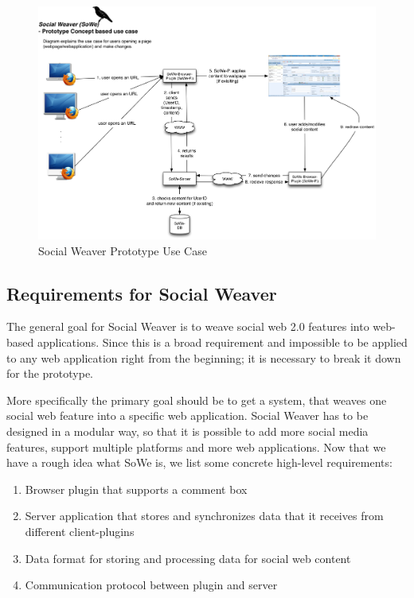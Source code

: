 \begin{figure}\centering
		\includegraphics[width=13cm]{images/sowe-prototype-use-case.png}
		\caption{Social Weaver Prototype Use Case}
		\label{sowe-prototype-use-case}
\end{figure} 

\subsection{Requirements for Social Weaver}\label{sowe-reqs}

The general goal for Social Weaver is to weave social web 2.0 features into web-based applications. Since this is a broad requirement and impossible to be applied to any web application right from the beginning; it is necessary to break it down for the prototype.

More specifically the primary goal should be to get a system, that weaves one social web feature into a specific web application. Social Weaver has to be designed in a modular way, so that it is possible to add more social media features, support multiple platforms and more web applications. Now that we have a rough idea what SoWe is, we list some concrete high-level requirements:

\begin{enumerate}
\item Browser plugin that supports a comment box
\item Server application that stores and synchronizes data that it receives from different client-plugins
\item Data format for storing and processing data for social web content
\item Communication protocol between plugin and server
\end{enumerate}

